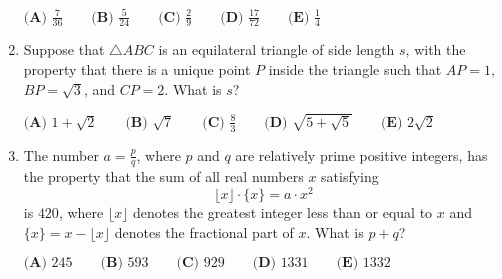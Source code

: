 \documentclass{article}%
\begin{document}
\begin{enumerate}
$\textbf{(A) } \frac{7}{36} \qquad\textbf{(B) } \frac{5}{24} \qquad\textbf{(C) } \frac{2}{9} \qquad\textbf{(D) } \frac{17}{72} \qquad\textbf{(E) } \frac{1}{4}$

%
\item%
[\textbf{Problem 24}]Suppose that $\triangle{ABC}$ is an equilateral triangle of side length $s$, with the property that there is a unique point $P$ inside the triangle such that $AP=1$, $BP=\sqrt{3}$, and $CP=2$. What is $s$?

$\textbf{(A) } 1+\sqrt{2} \qquad \textbf{(B) } \sqrt{7} \qquad \textbf{(C) } \frac{8}{3} \qquad \textbf{(D) } \sqrt{5+\sqrt{5}} \qquad \textbf{(E) } 2\sqrt{2}$

%
\item%
[\textbf{Problem 25}]The number $a=\frac{p}{q}$, where $p$ and $q$ are relatively prime positive integers, has the property that the sum of all real numbers $x$ satisfying
\[\lfloor x \rfloor \cdot \{x\} = a \cdot x^2\]
is $420$, where $\lfloor x \rfloor$ denotes the greatest integer less than or equal to $x$ and $\{x\}=x- \lfloor x \rfloor$ denotes the fractional part of $x$. What is $p+q$?

$\textbf{(A) } 245 \qquad \textbf{(B) } 593 \qquad \textbf{(C) } 929 \qquad \textbf{(D) } 1331 \qquad \textbf{(E) } 1332$

%
\end{enumerate}

%
\end{document}
